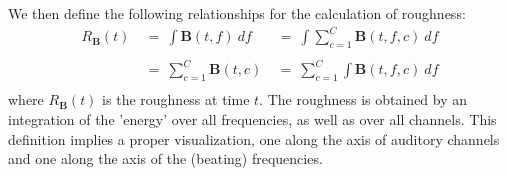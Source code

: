 We then define the following relationships for the calculation of
roughness:
\begin{equation}\label{R5}
\begin{array}{lll}
  R_\textbf{B}(t)&~=~\int \textbf{B}(t,f)~df
                 &~=~\int \sum_{c=1}^{C}
                 \textbf{B}(t,f,c)~df\\\\
                 &~=~\sum_{c=1}^{C} \textbf{B}(t,c)
                 &~=~\sum_{c=1}^{C} \int  \textbf{B}(t,f,c)~df\\
\end{array}
\end{equation}
where $R_\textbf{B}(t)$ is the roughness at time $t$. The
roughness is obtained by an integration of the 'energy' over all
frequencies, as well as over all channels. This definition
implies a proper visualization, one along the axis of auditory
channels and one along the axis of the (beating) frequencies.

%






